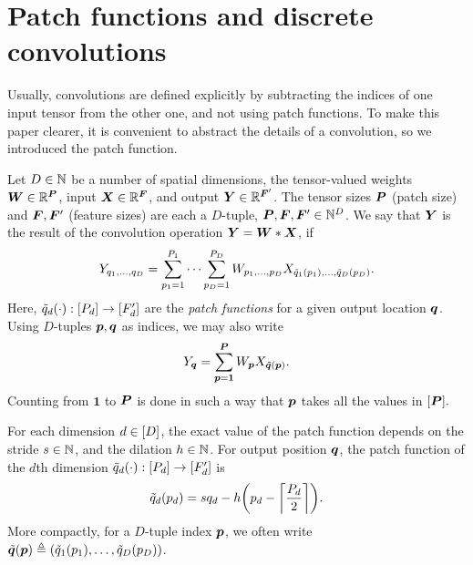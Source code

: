 \documentclass[accepted]{uai2021} %
\newcommand{\layersizebase}{\vF}
\newcommand{\patchsizebase}{\vP}
\newcommand{\patchsizebases}{P}
\newcommand{\patchf}[2]{{\tilde#1\bra{#2}}}
\newcommand{\patch}{\vp}               %
\newcommand{\patchs}{p}               %
\newcommand{\nextpatch}{\vq}
\newcommand{\nextpatchs}{q}
\newcommand{\0}{\boldsymbol{0}}
\newcommand{\1}{\boldsymbol{1}}
\begin{document}

\balance

\cleardoublepage

\appendix %
\section{Patch functions and discrete convolutions}
Usually, convolutions are defined explicitly by subtracting the indices of one input tensor from the other one, and not using patch functions. To make this paper clearer, it is convenient to abstract the details of a convolution, so we introduced the patch function.

\begin{definition}
  \label{def:convolution}
  Let $D \in {\mathbb{N}}$ be a number of spatial dimensions, the tensor-valued weights
  $\mW\in \sR^{\patchsizebase}$, input ${\bm{X}}\in {\mathbb{R}}^{{\bm{F}}}$, and output ${\bm{Y}} \in {\mathbb{R}}^{{\bm{F}}'}$.
  The tensor sizes $\patchsizebase$ (patch size) and $\layersizebase,\layersizebase'$ (feature sizes) are each a
  $D$-tuple, $\patchsizebase,\layersizebase,\layersizebase' \in \sN^{D}$.
  We say that ${\bm{Y}}$ is the result of the convolution operation ${\bm{Y}} = {\bm{W}}*{\bm{X}}$, if
  \begin{equation}
    Y_{\nextpatchs_{1},\dots,\nextpatchs_{D}} = \sum_{\patchs_{1}=1}^{P_{1}} \dots \sum_{\patchs_{D}=1}^{P_{D}} W_{\patchs_{1},\dots,\patchs_{D}} X_{\patchf{\nextpatchs_{1}}{\patchs_{1}}, \dots, \patchf{\nextpatchs_{D}}{\patchs_{D}}}.
    \label{eq:def-convolution-no-tuples}
  \end{equation}
  Here, $\patchf{\nextpatchs_{d}}{\cdot} : \countto{P_{d}} \to \countto{F'_{d}}$ are the \emph{patch functions} for a given output location $\nextpatch$. Using $D$-tuples $\patch,\nextpatch$ as indices, we may also write
  \begin{equation}
    Y_{\nextpatch} = \sum_{\patch=\1}^{\vP} W_{\patch} X_{\patchf{\nextpatch}{\patch}}.
    \label{eq:def-convolution-tuples}
  \end{equation}
  Counting from $\1$ to $\patchsizebase$ is done in such a way that $\patch$ takes all the values in $\countto{\patchsizebase}.$
  \end{definition}

  \begin{definition}
    \label{def:patchf}
    For each dimension $d \in [D]$, the exact value of the patch function
    depends on the stride $s\in{\mathbb{N}}$,
    and the dilation $h \in {\mathbb{N}}$.
   For output position $\nextpatch$, the patch function of the $d$th dimension $\patchf{\nextpatchs_{d}}{\cdot} : \countto{P_{d}} \to \countto{F'_{d}}$ is
\begin{equation}
  \patchf{\nextpatchs_{d}}{\patchs_{d}} = s\nextpatchs_{d} -  h\bra{\patchs_{d} - \ceil{\frac{\patchsizebases_{d}}{2}}} .
  \label{eq:def-patchf}
\end{equation}
More compactly, for a $D$-tuple index $\patch$, we often write $\patchf{\nextpatch}{\patch} \eqdef \bra{\patchf{\nextpatchs_{1}}{\patchs_{1}}, \dots, \patchf{\nextpatchs_{D}}{\patchs_{D}}}$.
\end{definition}
\end{document}
